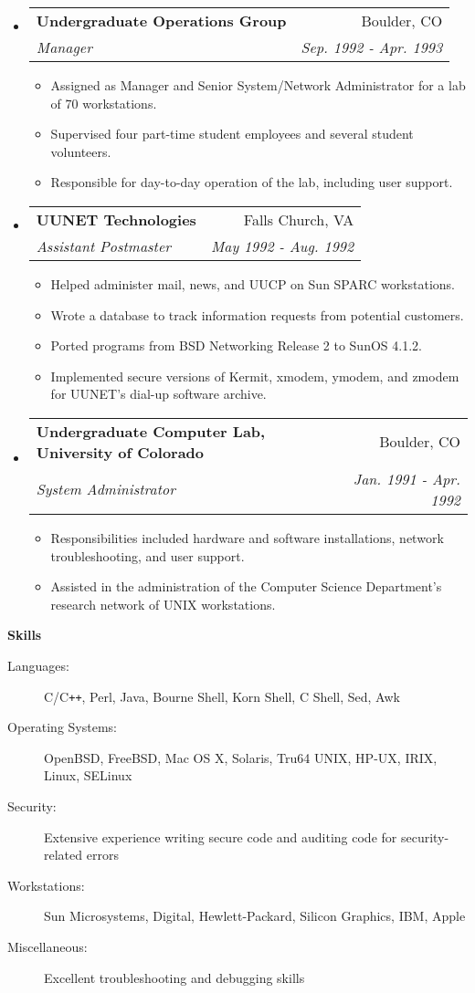 \documentclass[a4paper,11pt]{article}
\makeatletter
\newcommand{\resitem}[1]{\item #1 \vspace{-2pt}}
\newcommand{\resheading}[1]{{\large \colorbox{mygrey}{\begin{minipage}{\textwidth}{\textbf{#1 \vphantom{p\^{E}}}}\end{minipage}}}}
\newcommand{\ressubheading}[4]{
\begin{tabular*}{172mm}{l@{\extracolsep{\fill}}r}
		\textbf{#1} & #2 \\
		\textit{#3} & \textit{#4} \\
\end{tabular*}\vspace{-6pt}}
\makeatother
\begin{document}
\begin{itemize}
\item
	\ressubheading{Undergraduate Operations Group}{Boulder, CO}{Manager}{Sep. 1992 - Apr. 1993}
	\begin{itemize}
		\resitem{Assigned as Manager and Senior System/Network Administrator for a lab of 70 workstations.}
		\resitem{Supervised four part-time student employees and several student volunteers.}
		\resitem{Responsible for day-to-day operation of the lab, including user support.}
	\end{itemize}

\item
	\ressubheading{{\sc \bf UUNET} Technologies}{Falls Church, VA}{Assistant Postmaster}{May 1992 - Aug. 1992}
	\begin{itemize}
		\resitem{Helped administer mail, news, and {\sc UUCP} on Sun SPARC workstations.}
		\resitem{Wrote a database to track information requests from potential customers.}
		\resitem{Ported programs from BSD Networking Release 2 to SunOS 4.1.2.}
		\resitem{Implemented secure versions of Kermit, xmodem, ymodem, and zmodem for {\sc UUNET}'s dial-up software archive.}
	\end{itemize}

\item
	\ressubheading{Undergraduate Computer Lab, University of Colorado}{Boulder, CO}{System Administrator}{Jan. 1991 - Apr. 1992}
	\begin{itemize}
		\resitem{Responsibilities included hardware and software installations, network troubleshooting, and user support.}
		\resitem{Assisted in the administration of the Computer Science Department's research network of {\sc UNIX} workstations.}
	\end{itemize}

\end{itemize}

\pagebreak

\resheading{Skills}

\begin{description}
\item[Languages:]
C/C{}\verb!++!, Perl, Java, Bourne Shell, Korn Shell, C Shell, Sed, Awk
\item[Operating Systems:]
OpenBSD, FreeBSD, Mac OS X, Solaris, Tru64 {\sc UNIX}, {\sc HP-UX}, {\sc IRIX}, Linux, SELinux
\item[Security:]
Extensive experience writing secure code and auditing code for security-related errors
\item[Workstations:]
Sun Microsystems, Digital, Hewlett-Packard, Silicon Graphics, {\sc IBM}, Apple
\item[Miscellaneous:]
Excellent troubleshooting and debugging skills
\end{description}
\end{document}
